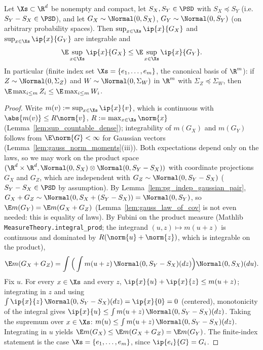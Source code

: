 \begin{lemma}\label{lem:gauss_comparison}
\leanok
{}
Let $\Xs \subset \R^d$ be nonempty and compact, let $S_X, S_Y \in \PSD$ with
$S_X \preceq S_Y$ (i.e.\ $S_Y - S_X \in \PSD$), and let $G_X \sim \Normal(0,S_X)$,
$G_Y \sim \Normal(0,S_Y)$ (on arbitrary probability spaces). Then
$\sup_{x\in\Xs}\ip{x}{G_X}$ and $\sup_{x\in\Xs}\ip{x}{G_Y}$ are integrable and
\[
  \E\sup_{x\in\Xs}\ip{x}{G_X} \le \E\sup_{x\in\Xs}\ip{x}{G_Y}.
\]
In particular (finite index set $\Xs = \{e_1,\dots,e_m\}$, the canonical basis of $\R^m$):
if $Z \sim \Normal(0,\Sigma_Z)$ and $W \sim \Normal(0,\Sigma_W)$ in $\R^m$ with
$\Sigma_Z \preceq \Sigma_W$, then $\E\max_{i\le m}Z_i \le \E\max_{i\le m}W_i$.
\end{lemma}

\begin{proof}
\leanok
{}
Write $m(v) := \sup_{x\in\Xs}\ip{x}{v}$, which is continuous with $\abs{m(v)} \le R\norm{v}$,
$R := \max_{x\in\Xs}\norm{x}$ (Lemma~\ref{lem:sup_countable_dense}); integrability of $m(G_X)$
and $m(G_Y)$ follows from $\E\norm{G} < \infty$ for Gaussian vectors
(Lemma~\ref{lem:gauss_norm_moments}(iii)). Both expectations depend only on the laws, so we may
work on the product space $(\R^d\times\R^d, \Normal(0,S_X)\otimes\Normal(0,S_Y-S_X))$ with
coordinate projections $G_X$ and $G_Z$, which are independent with
$G_Z \sim \Normal(0, S_Y - S_X)$ ($S_Y - S_X \in \PSD$ by assumption). By
Lemma~\ref{lem:pg_indep_gaussian_pair}, $G_X + G_Z \sim \Normal(0, S_X + (S_Y - S_X)) =
\Normal(0,S_Y)$, so $\E m(G_Y) = \E m(G_X + G_Z)$ (Lemma~\ref{lem:gauss_law_of_cov} is not
even needed: this is equality of laws). By Fubini on the product measure
(Mathlib \texttt{MeasureTheory.integral\_prod}; the integrand $(u,z)\mapsto m(u+z)$ is
continuous and dominated by $R(\norm{u}+\norm{z})$, which is integrable on the product),
\[
  \E m(G_X + G_Z) = \int\Big(\int m(u+z)\,\Normal(0,S_Y-S_X)(dz)\Big)\Normal(0,S_X)(du).
\]
Fix $u$. For every $x \in \Xs$ and every $z$, $\ip{x}{u} + \ip{x}{z} \le m(u+z)$; integrating in
$z$ and using $\int\ip{x}{z}\,\Normal(0,S_Y-S_X)(dz) = \ip{x}{0} = 0$ (centered), monotonicity
of the integral gives $\ip{x}{u} \le \int m(u+z)\,\Normal(0,S_Y-S_X)(dz)$. Taking the supremum
over $x\in\Xs$: $m(u) \le \int m(u+z)\,\Normal(0,S_Y-S_X)(dz)$. Integrating in $u$ yields
$\E m(G_X) \le \E m(G_X+G_Z) = \E m(G_Y)$. The finite-index statement is the case
$\Xs = \{e_1,\dots,e_m\}$, since $\ip{e_i}{G} = G_i$.
\end{proof}

